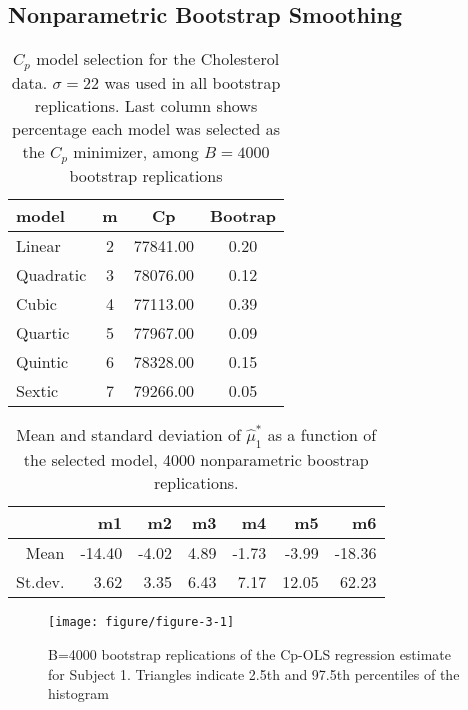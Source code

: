 \documentclass[11pt,letter]{article}\usepackage[]{graphicx}\usepackage[]{color}
\makeatletter
\def\maxwidth{ %
  \ifdim\Gin@nat@width>\linewidth
    \linewidth
  \else
    \Gin@nat@width
  \fi
}
\newenvironment{knitrout}{}{} %
\makeatother
\begin{document}
\subsection{Nonparametric Bootstrap Smoothing}









\begin{table}[ht]
\centering
\begin{tabular}{lccc}
  \hline
model & m & Cp & Bootrap \\ 
  \hline
Linear &   2 & 77841.00 & 0.20 \\ 
  Quadratic &   3 & 78076.00 & 0.12 \\ 
  Cubic &   4 & 77113.00 & 0.39 \\ 
  Quartic &   5 & 77967.00 & 0.09 \\ 
  Quintic &   6 & 78328.00 & 0.15 \\ 
  Sextic &   7 & 79266.00 & 0.05 \\ 
   \hline
\end{tabular}
\caption{$C_p$ model selection for the Cholesterol data. $\sigma=22$ was used in all bootstrap replications. Last column shows percentage each model was selected as the $C_p$ minimizer, among $B = 4000$ bootstrap replications} 
\end{table}



\begin{table}[ht]
\centering
\begin{tabular}{rrrrrrr}
  \hline
 & m1 & m2 & m3 & m4 & m5 & m6 \\ 
  \hline
Mean & -14.40 & -4.02 & 4.89 & -1.73 & -3.99 & -18.36 \\ 
  St.dev. & 3.62 & 3.35 & 6.43 & 7.17 & 12.05 & 62.23 \\ 
   \hline
\end{tabular}
\caption{Mean and standard deviation of $\hat{\mu}_1^*$ as a function of the selected model, 4000 nonparametric boostrap replications.} 
\end{table}


\begin{knitrout}
\color{fgcolor}\begin{figure}

{\centering \texttt{[image: figure/figure-3-1]} 

}

\caption[B=4000 bootstrap replications of the Cp-OLS regression estimate for Subject 1]{B=4000 bootstrap replications of the Cp-OLS regression estimate for Subject 1. Triangles indicate 2.5th and 97.5th percentiles of the histogram}\label{fig:figure-3}
\end{figure}


\end{knitrout}
\end{document}
